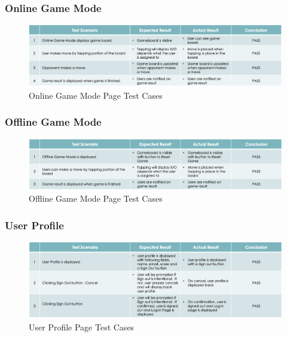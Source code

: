 \documentclass{article}
\begin{document}
    \subsubsection{Online Game Mode}
        \begin{figure}[h]
            \centering
            \includegraphics[width=5.5in]{images/test_5_online.png}
        \caption{Online Game Mode Page Test Cases}
        \end{figure}
    \subsubsection{Offline Game Mode}
        \begin{figure}[h]
            \centering
            \includegraphics[width=5.5in]{images/test_6_offline.png}
        \caption{Offline Game Mode Page Test Cases}
        \end{figure}
    \subsubsection{User Profile}
        \begin{figure}[h]
            \centering
            \includegraphics[width=5.5in]{images/test_7_profile.png}
        \caption{User Profile Page Test Cases}
        \end{figure}
    \newpage
\end{document}

